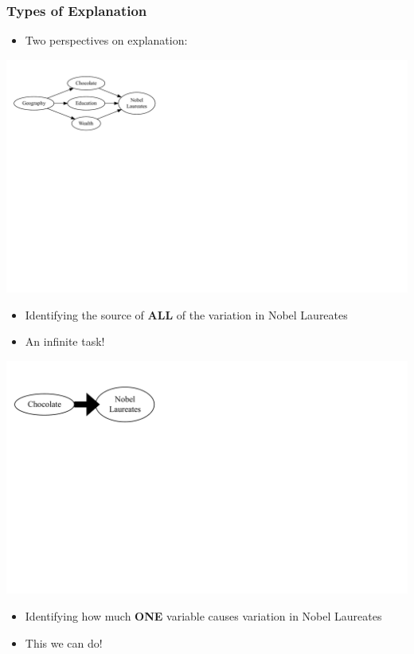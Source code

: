 \documentclass[xcolor=x11names,compress]{beamer}\usepackage[]{graphicx}\usepackage[]{color}
\makeatletter
\def\maxwidth{ %
  \ifdim\Gin@nat@width>\linewidth
    \linewidth
  \else
    \Gin@nat@width
  \fi
}
\newenvironment{knitrout}{}{} %
\renewcommand{\(}{\begin{columns}}
\renewcommand{\)}{\end{columns}}
\newcommand{\<}[1]{\begin{column}{#1}}
\renewcommand{\>}{\end{column}}
\makeatother
\begin{document}
\begin{frame}
\frametitle{Types of Explanation}
\begin{itemize}
\item Two perspectives on explanation:
\end{itemize}
\begin{multicols}{2}
\begin{knitrout}
\color{fgcolor}
\includegraphics[width=\maxwidth]{figure/explanation1b-1} 

\end{knitrout}
\begin{itemize}
\item Identifying the source of \textbf{ALL} of the variation in Nobel Laureates
\item An infinite task!
\end{itemize}
\columnbreak
\begin{knitrout}
\color{fgcolor}
\includegraphics[width=\maxwidth]{figure/explanation2b-1} 

\end{knitrout}
\begin{itemize}
\item Identifying how much \textbf{ONE} variable causes variation in Nobel Laureates
\item This we can do!
\end{itemize}
\end{multicols}
\end{frame}
\end{document}
